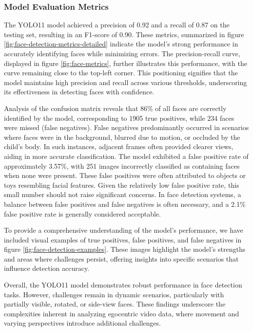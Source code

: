 \documentclass[
  man,floatsintext]{apa6}
\begin{document}
\subsubsection{Model Evaluation Metrics}\label{model-evaluation-metrics-1}

The YOLO11 model achieved a precision of 0.92 and a recall of 0.87 on the testing set, resulting in an F1-score of 0.90. These metrics, summarized in figure \ref{fig:face-detection-metrics-detailed} indicate the model's strong performance in accurately identifying faces while minimizing errors. The precision-recall curve, displayed in figure \ref{fig:face-metrics}, further illustrates this performance, with the curve remaining close to the top-left corner. This positioning signifies that the model maintains high precision and recall across various thresholds, underscoring its effectiveness in detecting faces with confidence.

Analysis of the confusion matrix reveals that 86\% of all faces are correctly identified by the model, corresponding to 1905 true positives, while 234 faces were missed (false negatives). False negatives predominantly occurred in scenarios where faces were in the background, blurred due to motion, or occluded by the child's body. In such instances, adjacent frames often provided clearer views, aiding in more accurate classification. The model exhibited a false positive rate of approximately 3.57\%, with 251 images incorrectly classified as containing faces when none were present. These false positives were often attributed to objects or toys resembling facial features. Given the relatively low false positive rate, this small number should not raise significant concerns. In face detection systems, a balance between false positives and false negatives is often necessary, and a 2.1\% false positive rate is generally considered acceptable.

To provide a comprehensive understanding of the model's performance, we have included visual examples of true positives, false positives, and false negatives in figure \ref{fig:face-detection-examples}. These images highlight the model's strengths and areas where challenges persist, offering insights into specific scenarios that influence detection accuracy.

Overall, the YOLO11 model demonstrates robust performance in face detection tasks. However, challenges remain in dynamic scenarios, particularly with partially visible, rotated, or side-view faces. These findings underscore the complexities inherent in analyzing egocentric video data, where movement and varying perspectives introduce additional challenges.
\end{document}
